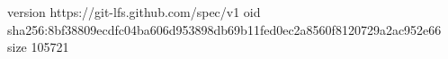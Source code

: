 version https://git-lfs.github.com/spec/v1
oid sha256:8bf38809ecdfc04ba606d953898db69b11fed0ec2a8560f8120729a2ac952e66
size 105721
